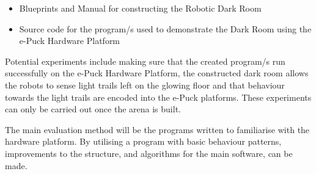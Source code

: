 \begin{itemize}
\item Blueprints and Manual for constructing the Robotic Dark Room
\item Source code for the program/s used to demonstrate the Dark Room using the
      e-Puck Hardware Platform
\end{itemize}

Potential experiments include making sure that the created program/s run
successfully on the e-Puck Hardware Platform, the constructed dark room allows
the robots to sense light trails left on the glowing floor and that behaviour
towards the light trails are encoded into the e-Puck platforms.  These
experiments can only be carried out once the arena is built.

The main evaluation method will be the programs written to familiarise with the
hardware platform.  By utilising a program with basic behaviour patterns, 
improvements to the structure, and algorithms for the main software, can be 
made.